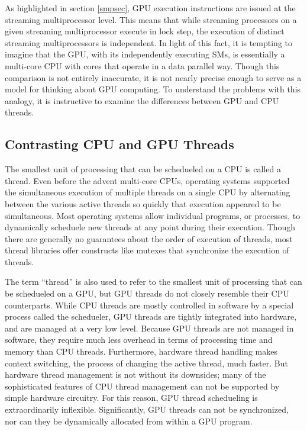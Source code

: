 \documentclass[12pt,twoside]{reedthesis}
\begin{document}
As highlighted in section \ref{smpsec}, GPU execution instructions are issued at the streaming multiprocessor level. This means that while streaming processors on a given streaming multiprocessor execute in lock step, the execution of distinct streaming multiprocessors is independent. In light of this fact, it is tempting to imagine that the GPU, with its independently executing SMs, is essentially a multi-core CPU with cores that operate in a data parallel way. Though this comparison is not entirely inaccurate, it is not nearly precise enough to serve as a model for thinking about GPU computing. To understand the problems with this analogy, it is instructive to examine the differences between GPU and CPU threads.

\subsection{Contrasting CPU and GPU Threads}

The smallest unit of processing that can be schedueled on a CPU is called a thread. Even before the advent multi-core CPUs, operating systems supported the simultaneous execution of multiple threads on a single CPU by alternating between the various active threads so quickly that execution appeared to be simultaneous. Most operating systems allow individual programs, or processes, to dynamically scheduele new threads at any point during their execution. Though there are generally no guarantees about the order of execution of threads, most thread libraries offer constructs like mutexes that synchronize the execution of threads.

The term ``thread'' is also used to refer to the smallest unit of processing that can be schedueled on a GPU, but GPU threads do not closely resemble their CPU counterparts. While CPU threads are mostly controlled in software by a special process called the schedueler, GPU threads are tightly integrated into hardware, and are managed at a very low level. Because GPU threads are not managed in software, they require much less overhead in terms of processing time and memory than CPU threads. Furthermore, hardware thread handling makes context switching, the process of changing the active thread, much faster. But hardware thread management is not without its downsides; many of the sophisticated features of CPU thread management can not be supported by simple hardware circuitry. For this reason, GPU thread schedueling is extraordinarily inflexible. Significantly, GPU threads can not be synchronized, nor can they be dynamically allocated from within a GPU program.
\end{document}

